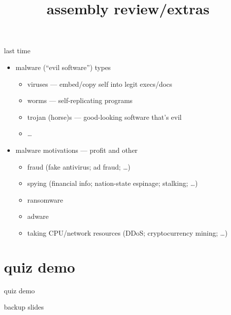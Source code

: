 \graphicspath{{./figures/}}
\title{assembly review/extras}
\date{}

\begin{frame}
    \titlepage
\end{frame}

\begin{frame}{last time}
    \begin{itemize}
    \item malware (``evil software'') types
        \begin{itemize}
        \item viruses --- embed/copy self into legit execs/docs
        \item worms --- self-replicating programs
        \item trojan (horse)s --- good-looking software that's evil
        \item \ldots
        \end{itemize}
    \item malware motivations --- profit and other
        \begin{itemize}
        \item fraud (fake antivirus; ad fraud; \ldots)
        \item spying (financial info; nation-state espinage; stalking; \ldots)
        \item ransomware
        \item adware
        \item taking CPU/network resources (DDoS; cryptocurrency mining; \ldots)
        \end{itemize}
    \end{itemize}
\end{frame}

\section{quiz demo}
\begin{frame}{quiz demo}
\end{frame}




\begin{frame}{backup slides}
\end{frame}




